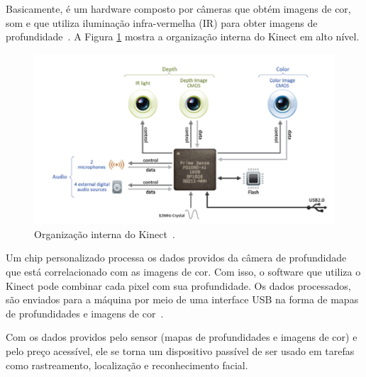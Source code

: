 Basicamente, é um hardware composto por câmeras que obtém imagens de cor, som e que utiliza iluminação infra-vermelha (IR) para obter imagens de profundidade~\cite{kinect}. A Figura \ref{kinect_interno} mostra a organização interna do Kinect em alto nível.

	\begin{figure}[hbt]
		\begin{center}
			\includegraphics[scale=0.8]{figuras/2.FundamentacaoTeorica/kinect_interno.png}
		\end{center}
		\caption{Organização interna do Kinect~\cite{kinect}.}
		\label{kinect_interno}
	\end{figure}

Um chip personalizado processa os dados providos da câmera de profundidade que está correlacionado com as imagens de cor. Com isso, o software que utiliza o Kinect pode combinar cada pixel com sua profundidade. Os dados processados, são enviados para a máquina por meio de uma interface USB na forma de mapas de profundidades e imagens de cor~\cite{kinect}.

Com os dados providos pelo sensor (mapas de profundidades e imagens de cor) e pelo preço acessível, ele se torna um dispositivo passível de ser usado em tarefas como rastreamento, localização e reconhecimento facial.
